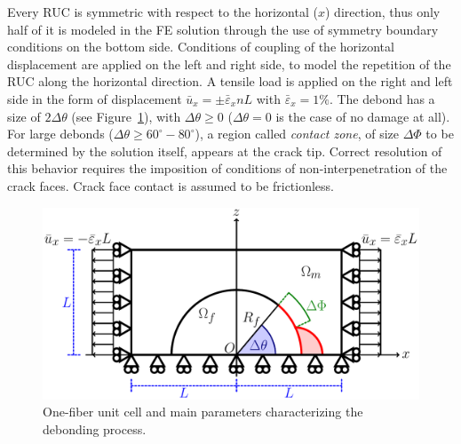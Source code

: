 
Every RUC is symmetric with respect to the horizontal ($x$) direction, thus only half of it is modeled in the FE solution through the use of symmetry boundary conditions on the bottom side. Conditions of coupling of the horizontal displacement are applied on the left and right side, to model the repetition of the RUC along the horizontal direction. A tensile load is applied on the right and left side in the form of displacement $\bar{u}_{x}=\pm\bar{\varepsilon}_{x}nL$ with $\bar{\varepsilon}_{x}=1\%$. The debond has a size of $2\Delta\theta$ (see Figure~\ref{paperE:fig:ruc}), with $\Delta\theta\geq0$ ($\Delta\theta=0$ is the case of no damage at all). For large debonds ($\Delta\theta\geq 60^{\circ}-80^{\circ}$), a region called \emph{contact zone}, of size $\Delta\Phi$ to be determined by the solution itself, appears at the crack tip. Correct resolution of this behavior requires the imposition of conditions of non-interpenetration of the crack faces. Crack face contact is assumed to be frictionless.

\begin{figure}[!h]
\centering
        \includegraphics[height=0.15\textheight]{paperE/RUC.pdf}
\caption{One-fiber unit cell and main parameters characterizing the debonding process.}\label{paperE:fig:ruc}
\end{figure}

